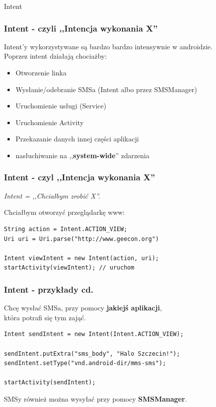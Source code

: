 \begin{frame}
\begin{center}
 \Huge{Intent}
\end{center}
\end{frame}

\begin{frame}\frametitle{Intent - czyli ,,Intencja wykonania X''}
Intent'y wykorzystywane są bardzo bardzo intensywnie w androidzie.\\
Poprzez intent działają chociażby:
\begin{itemize}
 \item Otworzenie linka
 \pause \item Wysłanie/odebranie SMSa \pause (Intent albo przez SMSManager)
 \pause \item Uruchomienie usługi (Service)
 \pause \item Uruchomienie Activity
 \pause \item Przekazanie danych innej części aplikacji
 \pause \item nasłuchiwanie na ,,\textbf{system-wide}'' zdarzenia
\end{itemize}
\end{frame}

\begin{frame}[fragile]\frametitle{Intent - czyl ,,Intencja wykonania X''}
\begin{center}
 \textit{Intent = ,,Chciałbym zrobić X''.}

\pause
Chciałbym otworzyć przeglądarkę www:
\end{center}

\begin{lstlisting}
String action = Intent.ACTION_VIEW; 
Uri uri = Uri.parse("http://www.geecon.org")

Intent viewIntent = new Intent(action, uri);
startActivity(viewIntent); // uruchom
\end{lstlisting}
\end{frame}

\begin{frame}[fragile]\frametitle{Intent - przykłady cd.}
\begin{center}
Chcę wysłać SMSa, przy pomocy \textbf{jakiejś aplikacji}, \\
która potrafi się tym zająć.
\end{center}

\begin{lstlisting}
Intent sendIntent = new Intent(Intent.ACTION_VIEW);

sendIntent.putExtra("sms_body", "Halo Szczecin!"); 
sendIntent.setType("vnd.android-dir/mms-sms");

startActivity(sendIntent);
\end{lstlisting}

\pause
SMSy również można wysyłać przy pomocy \textbf{SMSManager}.
\end{frame}

